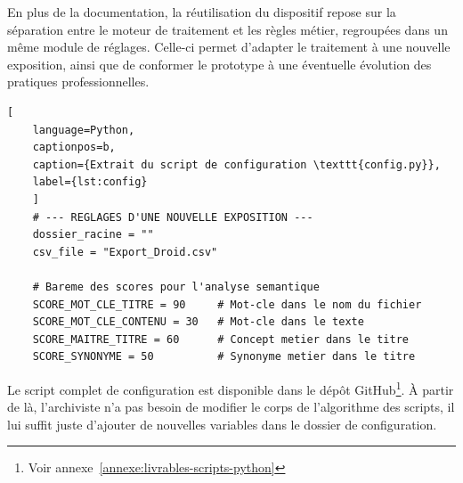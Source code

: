 En plus de la documentation, la réutilisation du dispositif repose sur la séparation entre le moteur de traitement et les règles métier, regroupées dans un même module de réglages. Celle-ci permet d'adapter le traitement à une nouvelle exposition, ainsi que de conformer le prototype à une éventuelle évolution des pratiques professionnelles. \\[0.1cm]

\begin{lstlisting}[
	language=Python,
	captionpos=b,
	caption={Extrait du script de configuration \texttt{config.py}},
	label={lst:config}
	]
	# --- REGLAGES D'UNE NOUVELLE EXPOSITION ---
	dossier_racine = ""
	csv_file = "Export_Droid.csv"
	
	# Bareme des scores pour l'analyse semantique
	SCORE_MOT_CLE_TITRE = 90     # Mot-cle dans le nom du fichier
	SCORE_MOT_CLE_CONTENU = 30   # Mot-cle dans le texte
	SCORE_MAITRE_TITRE = 60      # Concept metier dans le titre
	SCORE_SYNONYME = 50          # Synonyme metier dans le titre
\end{lstlisting}


Le script complet de configuration est disponible dans le dépôt GitHub\footnote{Voir annexe~\ref{annexe:livrables-scripts-python}}. À partir de là, l'archiviste n'a pas besoin de modifier le corps de l'algorithme des scripts, il lui suffit juste d'ajouter de nouvelles variables dans le dossier de configuration.

